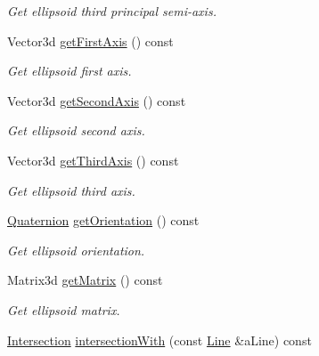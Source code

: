 \begin{DoxyCompactItemize}
\begin{DoxyCompactList}\small\item\em Get ellipsoid third principal semi-\/axis. \end{DoxyCompactList}\item 
Vector3d \hyperlink{classlibrary_1_1math_1_1geom_1_1d3_1_1objects_1_1_ellipsoid_a155ca01528d96ae76bfcbb155c832a20}{get\+First\+Axis} () const
\begin{DoxyCompactList}\small\item\em Get ellipsoid first axis. \end{DoxyCompactList}\item 
Vector3d \hyperlink{classlibrary_1_1math_1_1geom_1_1d3_1_1objects_1_1_ellipsoid_a33dde96894c213da77ee116ff18fdf86}{get\+Second\+Axis} () const
\begin{DoxyCompactList}\small\item\em Get ellipsoid second axis. \end{DoxyCompactList}\item 
Vector3d \hyperlink{classlibrary_1_1math_1_1geom_1_1d3_1_1objects_1_1_ellipsoid_a12dc0fd72c672b3d78ec9a286db30c70}{get\+Third\+Axis} () const
\begin{DoxyCompactList}\small\item\em Get ellipsoid third axis. \end{DoxyCompactList}\item 
\hyperlink{classlibrary_1_1math_1_1geom_1_1d3_1_1trf_1_1rot_1_1_quaternion}{Quaternion} \hyperlink{classlibrary_1_1math_1_1geom_1_1d3_1_1objects_1_1_ellipsoid_a8d426da587827eff577de4edb58ae417}{get\+Orientation} () const
\begin{DoxyCompactList}\small\item\em Get ellipsoid orientation. \end{DoxyCompactList}\item 
Matrix3d \hyperlink{classlibrary_1_1math_1_1geom_1_1d3_1_1objects_1_1_ellipsoid_ae6af9f16762e8c38b0a71c306d29ddbf}{get\+Matrix} () const
\begin{DoxyCompactList}\small\item\em Get ellipsoid matrix. \end{DoxyCompactList}\item 
\hyperlink{classlibrary_1_1math_1_1geom_1_1d3_1_1_intersection}{Intersection} \hyperlink{classlibrary_1_1math_1_1geom_1_1d3_1_1objects_1_1_ellipsoid_a5a043a5a0ad0c68771902824c9ea0190}{intersection\+With} (const \hyperlink{classlibrary_1_1math_1_1geom_1_1d3_1_1objects_1_1_line}{Line} \&a\+Line) const

\end{DoxyCompactItemize}

